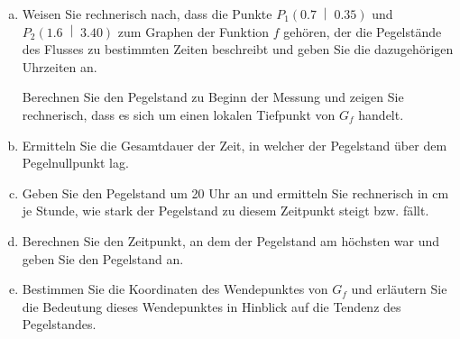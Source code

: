 \begin{exercise}
\begin{center}
    \end{center}
    \begin{enumerate}[a)]
      \item Weisen Sie rechnerisch nach, dass die Punkte
            $P_1\left(\num{0.7}\;\middle|\;\num{0.35}\right)$ und
            $P_2\left(\num{1.6}\;\middle|\;\num{3.40}\right)$
            zum Graphen der Funktion $f$ gehören, der die
            Pegelstände des Flusses zu bestimmten Zeiten
            beschreibt und geben Sie die dazugehörigen Uhrzeiten an.
            \par
            Berechnen Sie den Pegelstand zu Beginn der Messung
            und zeigen Sie rechnerisch, dass es sich um einen
            lokalen Tiefpunkt von $G_f$ handelt.
      \item Ermitteln Sie die Gesamtdauer der Zeit, in
            welcher der Pegelstand über dem Pegelnullpunkt lag.
      \item Geben Sie den Pegelstand um 20 Uhr an und ermitteln
            Sie rechnerisch in cm je Stunde, wie stark der
            Pegelstand zu diesem Zeitpunkt steigt bzw. fällt.
      \item Berechnen Sie den Zeitpunkt, an dem der Pegelstand
            am höchsten war und geben Sie den Pegelstand an.
      \item Bestimmen Sie die Koordinaten des Wendepunktes von
            $G_f$ und erläutern Sie die Bedeutung dieses
            Wendepunktes in Hinblick auf die Tendenz des
            Pegelstandes.
    \end{enumerate}
  \fi
\end{exercise}
